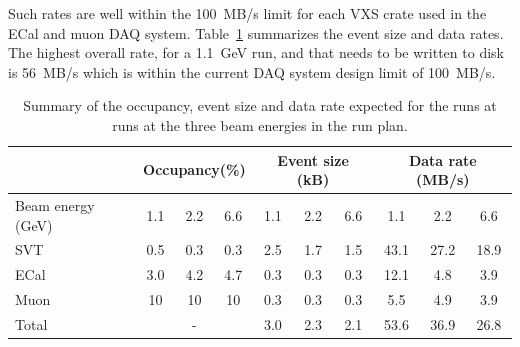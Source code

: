  Such rates are well within the 100~MB/s limit for each VXS crate used in the ECal and muon 
DAQ system.
Table~\ref{tab:data_rates} summarizes the event size and data rates. The highest overall rate, for a 1.1~GeV run, and that needs to be written to disk is 56~MB/s which is within the current 
DAQ system design limit of 100~MB/s. 
\begin{table}[]
\centering
\begin{tabular}{|l|ccc|ccc|ccc|}
\hline
 & \multicolumn{3}{|c|}{Occupancy(\%)} &  \multicolumn{3}{|c|}{Event size (kB)} &  \multicolumn{3}{|c|}{Data rate (MB/s)} \\
\hline
Beam energy (GeV) & 1.1 & 2.2 & 6.6 & 1.1 & 2.2 & 6.6 & 1.1 & 2.2 & 6.6 \\
\hline
SVT & 0.5 & 0.3  & 0.3  & 2.5 & 1.7 & 1.5 & 43.1 & 27.2 & 18.9\\
ECal & 3.0 & 4.2  & 4.7 & 0.3 & 0.3  & 0.3 & 12.1 & 4.8  & 3.9 \\
Muon & 10 &  10 & 10  & 0.3 & 0.3 & 0.3 & 5.5 & 4.9 & 3.9 \\
\hline
Total& \multicolumn{3}{|c|}{-} & 3.0 & 2.3 & 2.1 & 53.6 & 36.9 & 26.8 \\
\hline
\end{tabular}
\caption{{\small Summary of the occupancy, event size and data rate expected for the runs at  runs at the three beam 
energies in the run plan. }}
\label{tab:data_rates}
\end{table}
